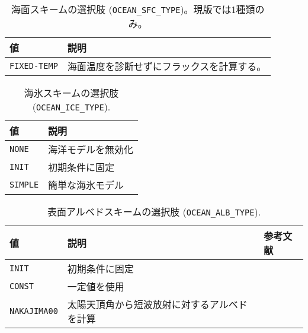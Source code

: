 \begin{table}[h]
\begin{center}
  \caption{海面スキームの選択肢 (\texttt{OCEAN\_SFC\_TYPE})。現版では1種類のみ。}
  \label{tab:nml_ocean_sfc}
  \begin{tabularx}{150mm}{lX} \hline
    \rowcolor[gray]{0.9}  値 & 説明 \\ \hline
      \verb|FIXED-TEMP| & 海面温度を診断せずにフラックスを計算する。\\
    \hline
  \end{tabularx}
\end{center}
\end{table}

\begin{table}[h]
\begin{center}
  \caption{海氷スキームの選択肢 (\texttt{OCEAN\_ICE\_TYPE}).}
  \label{tab:nml_ocean_ice}
  \begin{tabularx}{150mm}{lX} \hline
    \rowcolor[gray]{0.9}  値 & 説明 \\ \hline
      \verb|NONE|   & 海洋モデルを無効化 \\
      \verb|INIT|   & 初期条件に固定 \\
      \verb|SIMPLE| & 簡単な海氷モデル \\
    \hline
  \end{tabularx}
\end{center}
\end{table}

\begin{table}[h]
\begin{center}
  \caption{表面アルベドスキームの選択肢 (\texttt{OCEAN\_ALB\_TYPE}).}
  \label{tab:nml_ocean_alb}
  \begin{tabularx}{150mm}{llX} \hline
    \rowcolor[gray]{0.9}  値 & 説明 & 参考文献 \\ \hline
      \verb|INIT|       & 初期条件に固定 \\
      \verb|CONST|      & 一定値を使用 \\
      \verb|NAKAJIMA00| & 太陽天頂角から短波放射に対するアルベドを計算 & \citet{nakajima_2000} \\
    \hline
  \end{tabularx}
\end{center}
\end{table}

